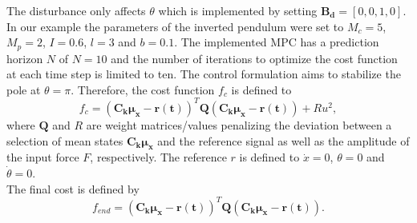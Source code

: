 \documentclass[letterpaper, 10 pt, conference]{ieeeconf}  %
\begin{document}
The disturbance only affects $\theta$ which is implemented by setting $\boldsymbol{B_d} = [0, 0, 1, 0]$.
In our example the parameters of the inverted pendulum were set to $M_c=5$, $M_p=2$, $I=0.6$, $l=3$ and $b=0.1$. The implemented MPC has a prediction horizon $N$ of $N=10$ and the number of iterations to optimize the cost function at each time step is limited to ten.
The control formulation aims to stabilize the pole at $\theta=\pi$. Therefore, the cost function $f_c$ is defined to
\begin{equation}
f_c= (\boldsymbol{C_k} \boldsymbol{\mu_x}-\boldsymbol{r(t)})^T \boldsymbol{Q} (\boldsymbol{C_k} \boldsymbol{\mu_x}-\boldsymbol{r(t)}) + R u^2,
\end{equation}
where $\boldsymbol{Q}$ and $R$ are weight matrices/values penalizing the deviation between a selection of mean states $\boldsymbol{C_k}\boldsymbol{\mu_x}$ and the reference signal as well as the amplitude of the input force $F$, respectively. The reference $r$ is defined to $\dot{x}= 0$, $\theta=0$ and $\dot{\theta}=0$.\\
The final cost is defined by
\begin{equation}
f_{end}= (\boldsymbol{C_k} \boldsymbol{\mu_x}-\boldsymbol{r(t)})^T \boldsymbol{Q} (\boldsymbol{C_k} \boldsymbol{\mu_x}-\boldsymbol{r(t)}).
\end{equation}
\end{document}
